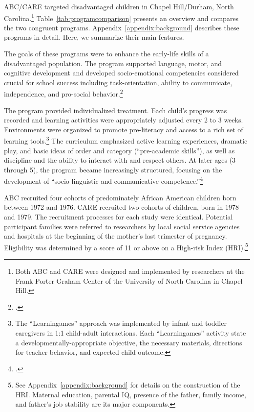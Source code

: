 ABC/CARE targeted disadvantaged children in Chapel Hill/Durham, North Carolina.\footnote{Both ABC and CARE were designed and implemented by researchers at the Frank Porter Graham Center of the University of North Carolina in Chapel Hill.} Table~\ref{tab:programcomparison} presents an overview and compares the two congruent programs. Appendix~\ref{appendix:background} describes these programs in detail. Here, we summarize their main features.

The goals of these programs were to enhance the early-life skills of a disadvantaged population. The program supported language, motor, and cognitive development and developed socio-emotional competencies considered crucial for school success including task-orientation, ability to communicate, independence, and pro-social behavior.\footnote{\citet{Ramey_Collier_etal_1976_CarolinaAbecedarianProject, Ramey_etal_1985_Project-CARE_TiECSE, Sparling_1974_Synth_Edu_Infant_SPEECH, Wasik_Ramey_etal_1990_CD, Ramey-etal_2012-ABC}.}

The program provided individualized treatment. Each child's progress was recorded and learning activities were appropriately adjusted every 2 to 3 weeks. Environments were organized to promote pre-literacy and access to a rich set of learning tools.\footnote{The ``Learningames'' approach was implemented by infant and toddler caregivers in 1:1 child-adult interactions. Each ``Learningames'' activity state a developmentally-appropriate objective, the necessary materials, directions for teacher behavior, and expected child outcome.} The curriculum emphasized active learning experiences, dramatic play, and basic ideas of order and category (``pre-academic skills''), as well as discipline and the ability to interact with and respect others.  At later ages (3 through 5), the program became increasingly structured, focusing on the development of ``socio-linguistic and communicative competence.''\footnote{\citet{Ramey-et-al_1977_Intro-to-ABC, Haskins_1985_CD, Ramey_1981_Modification, Ramey_Campbell_1979_SR, Ramey_Smith_1977_AJMD, Ramey_McGinness_etal_1982_Abecedarianapproach, Sparling_Lewis_1979_BOOKLearninggamesFirstThree,Sparling_Lewis_1984_BOOKLearningGamesThreesFours}.}

ABC recruited four cohorts of predominately African American children born between 1972 and 1976. CARE recruited two cohorts of children, born in 1978 and 1979. The recruitment processes for each study were identical. Potential participant families were referred to researchers by local social service agencies and hospitals at the beginning of the mother's last trimester of pregnancy. Eligibility was determined by a score of 11 or above on a High-risk Index (HRI).\footnote{See Appendix~\ref{appendix:background} for details on the construction of the HRI. Maternal education, parental IQ, presence of the father, family income, and father's job stability are its major components.}

